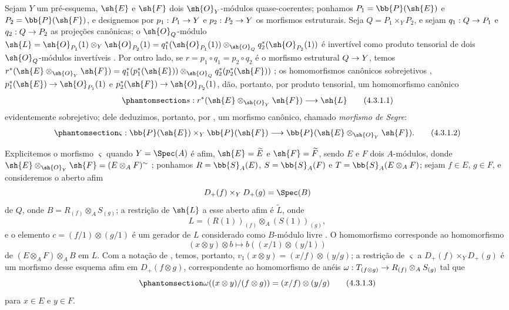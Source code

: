 \documentclass[oneside,10pt]{amsart}
\makeatletter
\newcommand{\ega@arrow}[2]{\mathchoice{#1}{#2}{#2}{#2}}
\renewcommand{\to}{\ega@arrow{\longrightarrow}{\rightarrow}}
\newcommand{\oldpage}[2][]{\marginnote{\normalfont\footnotesize\textbf{#1}~|~#2}\ignorespaces}
\let\EGAOriginalLabel\label
\renewcommand{\label}[1]{\phantomsection\EGAOriginalLabel{#1}}
\makeatother
\begin{document}
\begin{env}[4.3.1]
\label{II.4.3.1}
Sejam $Y$ um pré-esquema, $\sh{E}$ e $\sh{F}$ dois $\sh{O}_Y$-módulos quase-coerentes;
ponhamos $P_1=\bb{P}(\sh{E})$ e $P_2=\bb{P}(\sh{F})$, e designemos por $p_1:P_1\to Y$ e $p_2:P_2\to Y$ os morfismos estruturais.
Seja $Q=P_1\times_Y P_2$, e sejam $q_1:Q\to P_1$ e $q_2:Q\to P_2$ as projeções canônicas;
o $\sh{O}_Q$-módulo $\sh{L}=\sh{O}_{P_1}(1)\otimes_Y\sh{O}_{P_2}(1)=q_1^*(\sh{O}_{P_1}(1))\otimes_{\sh{O}_Q}q_2^*(\sh{O}_{P_2}(1))$ é invertível como produto tensorial de dois $\sh{O}_Q$-módulos invertíveis .
Por outro lado, se $r=p_1\circ q_1=p_2\circ q_2$ é o morfismo estrutural $Q\to Y$, temos $r^*(\sh{E}\otimes_{\sh{O}_Y}\sh{F})=q_1^*(p_1^*(\sh{E}))\otimes_{\sh{O}_Q}q_2^*(p_2^*(\sh{F}))$ ;
os homomorfismos canônicos sobrejetivos , $p_1^*(\sh{E})\to\sh{O}_{P_1}(1)$ e $p_2^*(\sh{F})\to\sh{O}_{P_2}(1)$, dão, portanto, por produto tensorial, um homomorfismo canônico
\[
\label{II.4.3.1.1}
  s:r^*(\sh{E}\otimes_{\sh{O}_Y}\sh{F})\to\sh{L}
  \tag{4.3.1.1}
\]
evidentemente sobrejetivo;
dele deduzimos, portanto, por , um morfismo canônico, chamado \emph{morfismo de Segre}:
\[
\label{II.4.3.1.2}
  \varsigma:\bb{P}(\sh{E})\times_Y\bb{P}(\sh{F})\to\bb{P}(\sh{E}\otimes_{\sh{O}_Y}\sh{F}).
  \tag{4.3.1.2}
\]

Explicitemos o morfismo $\varsigma$ quando $Y=\Spec(A)$ é afim, $\sh{E}=\widetilde{E}$ e $\sh{F}=\widetilde{F}$, sendo $E$ e $F$ dois $A$-módulos, donde $\sh{E}\otimes_{\sh{O}_Y}\sh{F}=(E\otimes_A F)^\sim$ ;
ponhamos $R=\bb{S}_A(E)$, $S=\bb{S}_A(F)$ e $T=\bb{S}_A(E\otimes_A F)$;
sejam $f\in E$, $g\in F$, e consideremos o aberto afim
\[
  D_+(f)\times_YD_+(g)=\Spec(B)
\]
\oldpage[II]{77}
de $Q$, onde $B=R_{(f)}\otimes_A S_{(g)}$;
a restrição de $\sh{L}$ a esse aberto afim é $\widetilde{L}$, onde
\[
  L=(R(1))_{(f)}\otimes_A(S(1))_{(g)},
\]
e o elemento $c=(f/1)\otimes(g/1)$ é um gerador de $L$ considerado como $B$-módulo livre .
O homomorfismo  corresponde ao homomorfismo
\[
  (x\otimes y)\otimes b\longmapsto b((x/1)\otimes(y/1))
\]
de $(E\otimes_A F)\otimes_A B$ em $L$.
Com a notação de , temos, portanto, $v_1(x\otimes y)=(x/f)\otimes(y/g)$;
a restrição de $\varsigma$ a $D_+(f)\times_YD_+(g)$ é um morfismo desse esquema afim em $D_+(f\otimes g)$, correspondente ao homomorfismo de anéis $\omega:T_{(f\otimes g)}\to R_{(f)}\otimes_A S_{(g)}$ tal que
\[
\label{II.4.3.1.3}
  \omega((x\otimes y)/(f\otimes g))=(x/f)\otimes(y/g)
  \tag{4.3.1.3}
\]
para $x\in E$ e $y\in F$.
\end{env}
\end{document}
